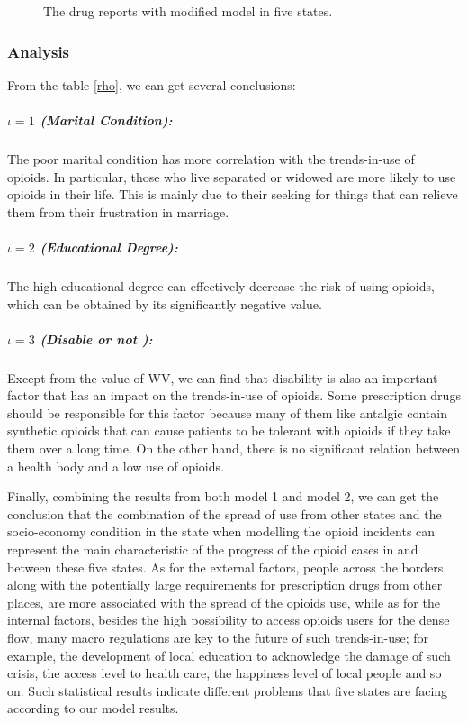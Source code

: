 \begin{figure}[htbp]
\centering
{}
\quad
{}
\quad
{}
\quad
{}
\quad
{}
\caption{The drug reports with modified model in five states.}\label{drug_five_modify}
\end{figure}

\subsubsection{Analysis}
From the table \ref{rho}, we can get several conclusions:
\subparagraph{$\iota=1$ (Marital Condition):} The poor marital condition has more correlation with the trends-in-use of opioids. In particular, those who live separated or widowed are more likely to use opioids in their life. This is mainly due to their seeking for things that can relieve them from their frustration in marriage.
\subparagraph{$\iota=2$ (Educational Degree):} The high educational degree can effectively decrease the risk of using opioids, which can be obtained by its significantly negative value.
\subparagraph{$\iota=3$ (Disable or not ):} Except from the value of WV, we can find that disability is also an important factor that has an impact on the trends-in-use of opioids. Some prescription drugs should be responsible for this factor because many of them like antalgic contain synthetic opioids that can cause patients to be tolerant with opioids if they take them over a long time. On the other hand, there is no significant relation between a health body and a low use of opioids.


Finally, combining the results from both model 1 and model 2, we can get the conclusion that the combination of the spread of use from other states and the socio-economy condition in the state when modelling the opioid incidents can represent the main characteristic of the progress of the opioid cases in and between these five states. As for the external factors, people across the borders, along with the potentially large requirements for prescription drugs from other places, are more associated with the spread of the opioids use, while as for the internal factors, besides the high possibility to access opioids users for the dense flow, many macro regulations are key to the future of such trends-in-use; for example, the development of local education to acknowledge the damage of such crisis, the access level to health care, the happiness level of local people and so on. Such statistical results indicate different problems that five states are facing according to our model results.

